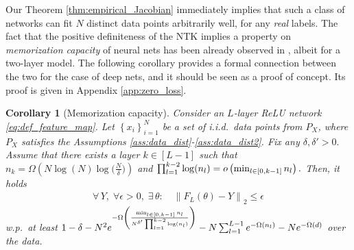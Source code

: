 \documentclass[11pt]{article}
\def\Set#1{\left\{ #1 \right\}}
\newtheorem{corollary}[theorem]{Corollary}
\newcommand{\littleO}[1]{o\left(#1\right)}
\newcommand{\bigOmg}[1]{\Omega\left(#1\right)}
\newcommand{\norm}[1]{\left\|#1\right\|}
\def\min{\mathop{\rm min}\nolimits}
\begin{document}
Our Theorem \ref{thm:empirical_Jacobian} immediately implies that such a class of networks
can fit $N$ distinct data points arbitrarily well, for any {\em real} labels. 
The fact that the positive definiteness of the NTK implies a property on {\em memorization capacity} of neural nets 
has been already observed in \citep{Andrea2020}, albeit for a two-layer model. 
The following corollary provides a formal connection between the two for the case of deep nets, 
and it should be seen as a proof of concept. Its proof is given in Appendix \ref{app:zero_loss}. 
\begin{corollary}[Memorization capacity]\label{cor:zero_loss}
    Consider an $L$-layer ReLU network \eqref{eq:def_feature_map}.
    Let $\Set{x_i}_{i=1}^{N}$ be a set of i.i.d.\ data points from $P_X$, 
    where $P_X$ satisfies the Assumptions \ref{ass:data_dist}-\ref{ass:data_dist2}.
    Fix any $\delta, \delta'>0.$
    Assume that there exists a layer $k\in[L-1]$ such that
	$n_k = \bigOmg{N\log(N) \log\Big(\frac{N}{\delta}\Big)}$ and
	$\prod_{l=1}^{k-2} \log(n_l)=\littleO{\min_{l\in[0,k-1]} n_l}.$
    Then, it holds
    \begin{align*}
	\forall\, Y,\; \forall\epsilon>0,\; \exists\,\theta: \quad\norm{F_L(\theta)-Y}_2\leq\epsilon
    \end{align*}
    w.p.\ at least
	$ 1 - \delta - N^2 e^{ - \bigOmg{ \frac{\min_{l\in[0,k-1]}n_l}{N^{\delta'} \prod_{l=1}^{k-2}\log(n_l)} } } - N \sum_{l=1}^{L-1} e^{-\bigOmg{n_l}} - N e^{-\bigOmg{d}} $
    over the data.
\end{corollary}
% 
\end{document}
